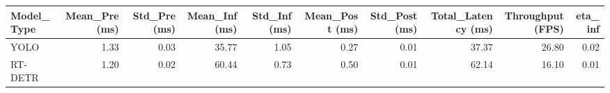 \begin{tabular}{lrrrrrrrrr}
\toprule
Model_Type & Mean_Pre (ms) & Std_Pre (ms) & Mean_Inf (ms) & Std_Inf (ms) & Mean_Post (ms) & Std_Post (ms) & Total_Latency (ms) & Throughput (FPS) & eta_inf \\
\midrule
YOLO & 1.33 & 0.03 & 35.77 & 1.05 & 0.27 & 0.01 & 37.37 & 26.80 & 0.02 \\
RT-DETR & 1.20 & 0.02 & 60.44 & 0.73 & 0.50 & 0.01 & 62.14 & 16.10 & 0.01 \\
\bottomrule
\end{tabular}
